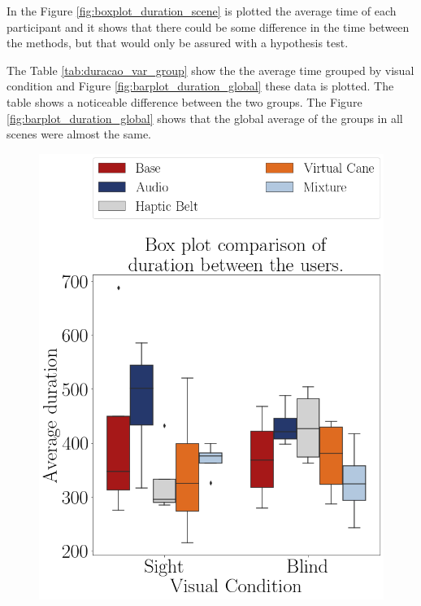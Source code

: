 In the Figure \ref{fig:boxplot_duration_scene} is plotted the average time of each participant and it shows that there could be some difference in the time between the methods, but that would only be assured with a hypothesis test. 

%

The Table \ref{tab:duracao_var_group} show the the average time grouped by visual condition and Figure \ref{fig:barplot_duration_global} these data is plotted. The table shows a noticeable difference between the two groups. The Figure \ref{fig:barplot_duration_global} shows that the global average of the groups in all scenes were almost the same.



\begin{figure}[!htb]
    \begin{minipage}{.45\linewidth}
        \centering
        \includegraphics[width = \linewidth]{Resultados/Tempo/Figuras/png/boxplot_duration_scene.png}

\end{minipage}
\end{figure}
